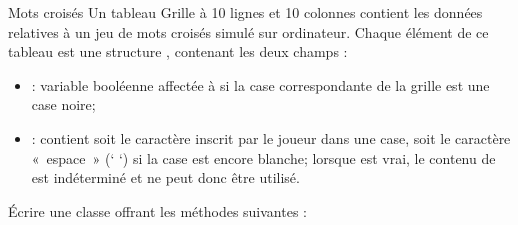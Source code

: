 \begin{Exercice}{Mots croisés}
	Un tableau Grille à 10 lignes et 10 colonnes contient les données
	relatives à un jeu de mots croisés simulé sur ordinateur. Chaque
	élément de ce tableau est une structure ,
	contenant les deux champs :

	\liststyleListi
	\begin{itemize}
		\item 
			 : variable booléenne affectée à
			 si la case correspondante de la grille est une
			case noire;
		\item 
			 : contient soit le caractère inscrit par le
			joueur dans une case, soit le caractère «~espace~» (‘ ‘) si la case est
			encore blanche; lorsque  est vrai, le contenu
			de  est indéterminé et ne peut donc être
			utilisé. 
	\end{itemize}
	
	Écrire une classe  offrant les méthodes
	suivantes :


\end{Exercice}

